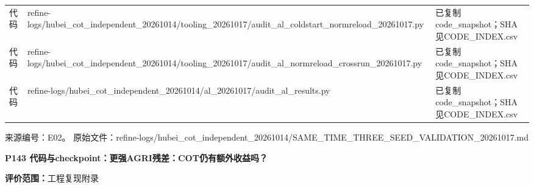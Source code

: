 \documentclass[UTF8,a4paper,landscape,10pt]{ctexart}
\begin{document}
\begin{center}
\begin{adjustbox}{max totalheight=0.58\textheight,max width=\linewidth}
\begin{minipage}{\linewidth}
\begin{tabularx}{\linewidth}{>{\hsize=0.3500\hsize\raggedright\arraybackslash}X>{\hsize=1.9000\hsize\raggedright\arraybackslash}X>{\hsize=0.7500\hsize\raggedright\arraybackslash}X}
代码 & refine-logs/\allowbreak{}hubei\_\allowbreak{}cot\_\allowbreak{}independent\_\allowbreak{}20261014/\allowbreak{}tooling\_\allowbreak{}20261017/\allowbreak{}audit\_\allowbreak{}al\_\allowbreak{}coldstart\_\allowbreak{}normreload\_\allowbreak{}20261017.py & 已复制code\_\allowbreak{}snapshot；SHA见CODE\_\allowbreak{}INDEX.csv \\
代码 & refine-logs/\allowbreak{}hubei\_\allowbreak{}cot\_\allowbreak{}independent\_\allowbreak{}20261014/\allowbreak{}tooling\_\allowbreak{}20261017/\allowbreak{}audit\_\allowbreak{}al\_\allowbreak{}normreload\_\allowbreak{}crossrun\_\allowbreak{}20261017.py & 已复制code\_\allowbreak{}snapshot；SHA见CODE\_\allowbreak{}INDEX.csv \\
代码 & refine-logs/\allowbreak{}hubei\_\allowbreak{}cot\_\allowbreak{}independent\_\allowbreak{}20261014/\allowbreak{}al\_\allowbreak{}20261017/\allowbreak{}audit\_\allowbreak{}al\_\allowbreak{}results.py & 已复制code\_\allowbreak{}snapshot；SHA见CODE\_\allowbreak{}INDEX.csv \\
\bottomrule\end{tabularx}\end{minipage}\end{adjustbox}\end{center}
\vfill{\scriptsize\color{muted} 来源编号：E02。 原始文件：refine-logs/\allowbreak{}hubei\_\allowbreak{}cot\_\allowbreak{}independent\_\allowbreak{}20261014/\allowbreak{}SAME\_\allowbreak{}TIME\_\allowbreak{}THREE\_\allowbreak{}SEED\_\allowbreak{}VALIDATION\_\allowbreak{}20261017.md}\par
\clearpage
{\large\bfseries\color{ink} P143  代码与checkpoint：更强AGRI残差：COT仍有额外收益吗？}\par
{}\par
{\small\color{muted}\textbf{评价范围：}工程复现附录}\par\vspace{3mm}
\end{document}
